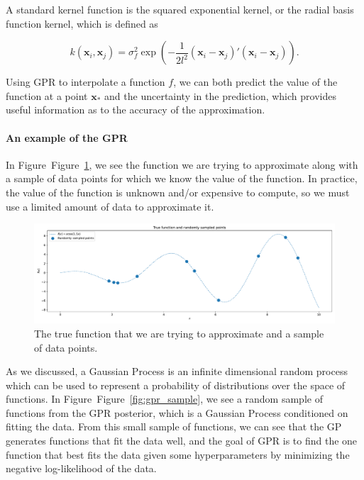 \documentclass{article}
\begin{document}
A standard kernel function is the squared exponential kernel, or the radial basis function kernel, which is defined as

\begin{equation}
k(\mathbf{x}_i, \mathbf{x}_j) = \sigma^2_f \exp\left(-\frac{1}{2l^2} (\mathbf{x}_i - \mathbf{x}_j)' (\mathbf{x}_i - \mathbf{x}_j)\right).
\end{equation}

Using GPR to interpolate a function $f$, we can both predict the value of the function at a point $\mathbf{x}_*$ and the uncertainty in the prediction, which provides useful information as to the accuracy of the approximation.

\paragraph{An example of the GPR}\label{An example of the GPR}

In Figure~Figure~\ref{fig:true_function}, we see the function we are trying to approximate along with a sample of data points for which we know the value of the function. In practice, the value of the function is unknown and/or expensive to compute, so we must use a limited amount of data to approximate it.

\begin{figure}[!htbp]
\centering
\includegraphics[width=0.7\linewidth]{Figures/true_function.pdf}
\caption{The true function that we are trying to approximate and a sample of data points.}
\label{fig:true_function}
\end{figure}

As we discussed, a Gaussian Process is an infinite dimensional random process which can be used to represent a probability of distributions over the space of functions. In Figure~Figure~\ref{fig:gpr_sample}, we see a random sample of functions from the GPR posterior, which is a Gaussian Process conditioned on fitting the data. From this small sample of functions, we can see that the GP generates functions that fit the data well, and the goal of GPR is to find the one function that best fits the data given some hyperparameters by minimizing the negative log-likelihood of the data.
\end{document}
